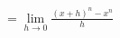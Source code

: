 \documentclass[preview]{standalone}
\begin{document}
\begin{align*}
=\lim_{h\to0}\frac{(x+h)^n-x^n}{h}
\end{align*}
\end{document}
